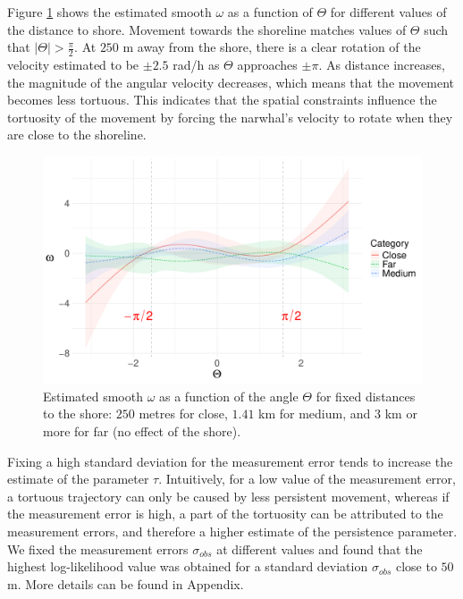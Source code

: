 \documentclass[aoas]{imsart}
\theoremstyle{definition}
\theoremstyle{remark}
\theoremstyle{remark}
\newcommand {\1}{\mathbb{1}}
\begin{document}
Figure \ref{fig:febaseline3omegaanglenormalq0} shows the estimated smooth $\omega$ as a function of $\Theta$ for different values of the distance to shore. Movement towards the shoreline matches values of $\Theta$ such that $\vert \Theta \vert > \frac{\pi}{2}$. At $250$ m away from the shore, there is a clear rotation of the velocity estimated to be $\pm 2.5$ rad/h as $\Theta$ approaches $\pm\pi$. As distance increases, the magnitude of the angular velocity decreases, which means that the movement becomes less tortuous. This indicates that the spatial constraints influence the tortuosity of the movement by forcing the narwhal's velocity to rotate when they are close to the shoreline.   %
\begin{figure}[ht!]
	\centering
	\includegraphics[width=0.7\linewidth]{"images/application/baseline/omega_DistanceShore_levels.pdf"}
	\caption{Estimated smooth $\omega$ as a function of the angle $\Theta$ for fixed distances to the shore: $250$ metres for close, $1.41$ km for medium, and $3$ km or more for far (no effect of the shore).}
	
	\label{fig:febaseline3omegaanglenormalq0}
\end{figure}


Fixing a high standard deviation for the measurement error tends to increase the estimate of the parameter $\tau$. Intuitively, for a low value of the measurement error, a tortuous trajectory can only be caused by less persistent movement, whereas if the measurement error is high, a part of the tortuosity can be attributed to the measurement errors, and therefore a higher estimate of the persistence parameter. We fixed the measurement errors $\sigma_{obs}$ at different values and found that the highest log-likelihood value was obtained for a standard deviation $\sigma_{obs}$ close to $50$m. More details can be found in Appendix.
\end{document}
